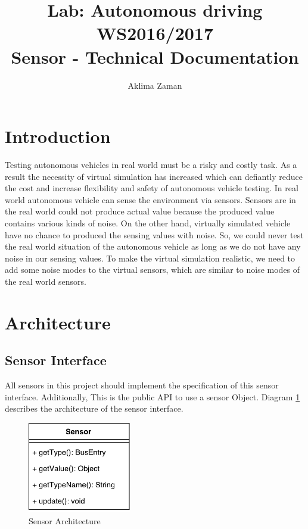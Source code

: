 \documentclass[]{article}
\title{Lab: Autonomous driving WS2016/2017 \\
Sensor - Technical Documentation}
\author{Aklima Zaman}
\begin{document}
\setlength{\parindent}{0pt}
\setlength{\parskip}{1.5ex plus0.5ex minus0.5ex}

\maketitle

\clearpage

\tableofcontents

\clearpage



\section{Introduction}
\label{sec::intro}
Testing autonomous vehicles in real world must be a risky and costly task. As a result the necessity of virtual simulation has increased which can defiantly reduce the cost and increase flexibility and safety of autonomous vehicle testing. In real world autonomous vehicle can sense the environment via sensors. Sensors are in the real world could not produce actual value because the produced value contains various kinds of noise. On the other hand, virtually simulated vehicle have no chance to produced the sensing values with noise. So, we could never test the real world situation of the autonomous vehicle as long as we do not have any noise in our sensing values. To make the virtual simulation realistic, we need to add some noise modes to the virtual sensors, which are similar to noise modes of the real world sensors.
\section{Architecture}
\label{sec::architecture}
\subsection{Sensor Interface}
All sensors in this project should implement the specification of this sensor interface. Additionally, This is the public API to use a sensor Object. Diagram \ref{fig::si} describes the architecture of the sensor interface.

\begin{figure}[H]
	\centering
	\includegraphics[width=0.4\textwidth]{SensorInterface.pdf}
	\caption{Sensor Architecture}
	\label{fig::si}
\end{figure}
\end{document}
